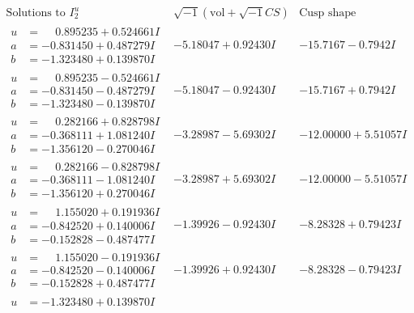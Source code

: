 \documentclass[1p]{elsarticle_modified}
\theoremstyle{definition}
\newcommand{\I}{\sqrt{-1}}
\begin{document}
$$\begin{array}{c|c|c}  
\text{Solutions to }I^u_{2}& \I (\text{vol} + \sqrt{-1}CS) & \text{Cusp shape}\\
 \hline 
\begin{aligned}
u &= \phantom{-}0.895235 + 0.524661 I \\
a &= -0.831450 + 0.487279 I \\
b &= -1.323480 + 0.139870 I\end{aligned}
 & -5.18047 + 0.92430 I & -15.7167 - 0.7942 I \\ \hline\begin{aligned}
u &= \phantom{-}0.895235 - 0.524661 I \\
a &= -0.831450 - 0.487279 I \\
b &= -1.323480 - 0.139870 I\end{aligned}
 & -5.18047 - 0.92430 I & -15.7167 + 0.7942 I \\ \hline\begin{aligned}
u &= \phantom{-}0.282166 + 0.828798 I \\
a &= -0.368111 + 1.081240 I \\
b &= -1.356120 - 0.270046 I\end{aligned}
 & -3.28987 - 5.69302 I & -12.00000 + 5.51057 I \\ \hline\begin{aligned}
u &= \phantom{-}0.282166 - 0.828798 I \\
a &= -0.368111 - 1.081240 I \\
b &= -1.356120 + 0.270046 I\end{aligned}
 & -3.28987 + 5.69302 I & -12.00000 - 5.51057 I \\ \hline\begin{aligned}
u &= \phantom{-}1.155020 + 0.191936 I \\
a &= -0.842520 + 0.140006 I \\
b &= -0.152828 - 0.487477 I\end{aligned}
 & -1.39926 - 0.92430 I & -8.28328 + 0.79423 I \\ \hline\begin{aligned}
u &= \phantom{-}1.155020 - 0.191936 I \\
a &= -0.842520 - 0.140006 I \\
b &= -0.152828 + 0.487477 I\end{aligned}
 & -1.39926 + 0.92430 I & -8.28328 - 0.79423 I \\ \hline\begin{aligned}
u &= -1.323480 + 0.139870 I \\

\end{aligned}
\end{array}$$
\end{document}
